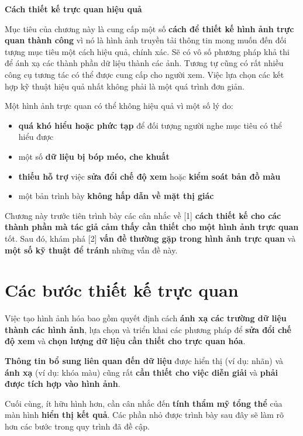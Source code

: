 \textbf{Cách thiết kế trực quan hiệu quả}

Mục tiêu của chương này là cung cấp một số \textbf{cách để thiết kế hình
ảnh trực quan thành công} vì nó là hình ảnh truyền tải thông tin mong
muốn đến đối tượng mục tiêu một cách hiệu quả, chính xác. Sẽ có vô số
phương pháp khả thi để ánh xạ các thành phần dữ liệu thành các ảnh.
Tương tự cũng có rất nhiều công cụ tương tác có thể được cung cấp cho
người xem. Việc lựa chọn các kết hợp kỹ thuật hiệu quả nhất không phải
là một quá trình đơn giản.

Một hình ảnh trực quan có thể không hiệu quả vì một số lý do:

\begin{itemize}
\tightlist
\item
  \textbf{quá khó hiểu hoặc phức tạp} để đối tượng người nghe mục tiêu
  có thể hiểu được
\item
  một số \textbf{dữ liệu bị bóp méo, che khuất}
\item
  \textbf{thiếu hỗ trợ} việc \textbf{sửa đổi chế độ xem} hoặc
  \textbf{kiểm soát bản đồ màu}
\item
  một bản trình bày \textbf{không hấp dẫn về mặt thị giác}
\end{itemize}

Chương này trước tiên trình bày các cân nhắc về {[}1{]} \textbf{cách
thiết kế cho các thành phần mà tác giả cảm thấy cần thiết cho một hình
ảnh trực quan} tốt. Sau đó, khám phá {[}2{]} \textbf{vấn đề thường gặp
trong hình ảnh trực quan} và \textbf{một số kỹ thuật để tránh} những vấn
đề này.

\section{Các bước thiết kế trực
quan}\label{cuxe1c-bux1b0ux1edbc-thiux1ebft-kux1ebf-trux1ef1c-quan}

Việc tạo hình ảnh hóa bao gồm quyết định cách \textbf{ánh xạ các trường
dữ liệu thành các hình ảnh}, lựa chọn và triển khai các phương pháp để
\textbf{sửa đổi chế độ xem} và \textbf{chọn lượng dữ liệu cần thiết cho
trực quan hóa}.

\textbf{Thông tin bổ sung liên quan đến dữ liệu} được hiển thị (ví dụ:
nhãn) và \textbf{ánh xạ} (ví dụ: khóa màu) cũng rất \textbf{cần thiết
cho việc diễn giải} và \textbf{phải được tích hợp vào hình ảnh}.

Cuối cùng, ít hữu hình hơn, cần cân nhắc đến \textbf{tính thẩm mỹ tổng
thể} của màn hình \textbf{hiển thị kết quả}. Các phần nhỏ được trình bày
sau đây sẽ làm rõ hơn các bước trong quy trình đã đề cập.

